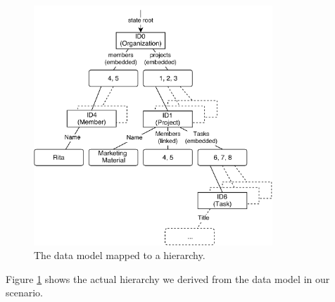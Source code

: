 \begin{figure}[hierarchy]
  \centering
  \includegraphics[width=0.8\textwidth]{img/hierarchy}
  \caption{The data model mapped to a hierarchy.}
  \label{fig:histo.hierarchy}
\end{figure}

Figure \ref{fig:histo.hierarchy} shows the actual hierarchy we derived from the data model in our scenario.